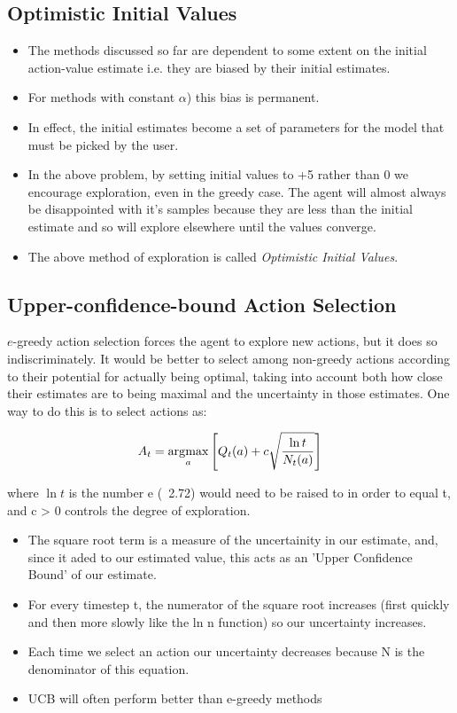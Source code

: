 \subsection{Optimistic Initial Values}
\begin{itemize}
\item The methods discussed so far are dependent to some extent on the initial action-value estimate i.e. they are biased by their initial estimates.
\item For methods with constant \(\alpha\)) this bias is permanent.
\item In effect, the initial estimates become a set of parameters for the model that must be picked by the user.
\item In the above problem, by setting initial values to +5 rather than 0 we encourage exploration, even in the greedy case. The agent will almost always be disappointed with it's samples because they are less than the initial estimate and so will explore elsewhere until the values converge.
\item The above method of exploration is called \textit{Optimistic Initial Values}.
\end{itemize}

\subsection{Upper-confidence-bound Action Selection}
\(e\)-greedy action selection forces the agent to explore new actions, but it does so indiscriminately. It would be better to select among non-greedy actions according to their potential for actually being optimal, taking into account both how close their estimates are to being maximal and the uncertainty in those estimates. One way to do this is to select actions as:

\begin{equation}
	A_t = \operatorname*{\arg\!\max}_a \left[Q_t(a) + c\sqrt{\frac{\ln t}{N_t(a)}}\right]
\end{equation}

where \(\ln t\) is the number e (~2.72) would need to be raised to in order to equal t, and c > 0 controls the degree of exploration.

\begin{itemize}
	\item The square root term is a measure of the uncertainity in our estimate, and, since it aded to our estimated value, this acts as an 'Upper Confidence Bound' of our estimate.
	\item For every timestep t, the numerator of the square root increases (first quickly and then more slowly like the ln n function) so our uncertainty increases.
	\item Each time we select an action our uncertainty decreases because N is the denominator of this equation.
	\item UCB will often perform better than e-greedy methods
\end{itemize}

